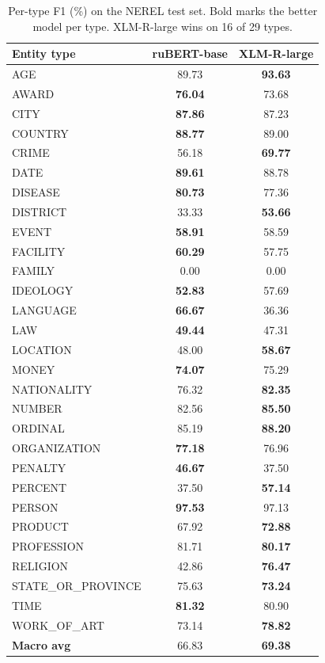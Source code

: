 \documentclass{article}
\begin{document}
\begin{table}[!tbh]
\begin{center}
\small
\begin{tabular}[t]{|l|cc|}
\hline
Entity type & ruBERT-base & XLM-R-large \\
\hline
AGE              & 89.73 & \textbf{93.63} \\
AWARD            & \textbf{76.04} & 73.68 \\
CITY             & \textbf{87.86} & 87.23 \\
COUNTRY          & \textbf{88.77} & 89.00 \\
CRIME            & 56.18 & \textbf{69.77} \\
DATE             & \textbf{89.61} & 88.78 \\
DISEASE          & \textbf{80.73} & 77.36 \\
DISTRICT         & 33.33 & \textbf{53.66} \\
EVENT            & \textbf{58.91} & 58.59 \\
FACILITY         & \textbf{60.29} & 57.75 \\
FAMILY           & 0.00  & 0.00  \\
IDEOLOGY         & \textbf{52.83} & 57.69 \\
LANGUAGE         & \textbf{66.67} & 36.36 \\
LAW              & \textbf{49.44} & 47.31 \\
LOCATION         & 48.00 & \textbf{58.67} \\
MONEY            & \textbf{74.07} & 75.29 \\
NATIONALITY      & 76.32 & \textbf{82.35} \\
NUMBER           & 82.56 & \textbf{85.50} \\
ORDINAL          & 85.19 & \textbf{88.20} \\
ORGANIZATION     & \textbf{77.18} & 76.96 \\
PENALTY          & \textbf{46.67} & 37.50 \\
PERCENT          & 37.50 & \textbf{57.14} \\
PERSON           & \textbf{97.53} & 97.13 \\
PRODUCT          & 67.92 & \textbf{72.88} \\
PROFESSION       & 81.71 & \textbf{80.17} \\
RELIGION         & 42.86 & \textbf{76.47} \\
STATE\_OR\_PROVINCE & 75.63 & \textbf{73.24} \\
TIME             & \textbf{81.32} & 80.90 \\
WORK\_OF\_ART   & 73.14 & \textbf{78.82} \\
\hline
\textbf{Macro avg} & 66.83 & \textbf{69.38} \\
\hline
\end{tabular}
\caption{Per-type F1 (\%) on the NEREL test set. Bold marks the better model
         per type. XLM-R-large wins on 16 of 29 types.}
\label{tab:perclass}
\end{center}
\end{table}
\end{document}
